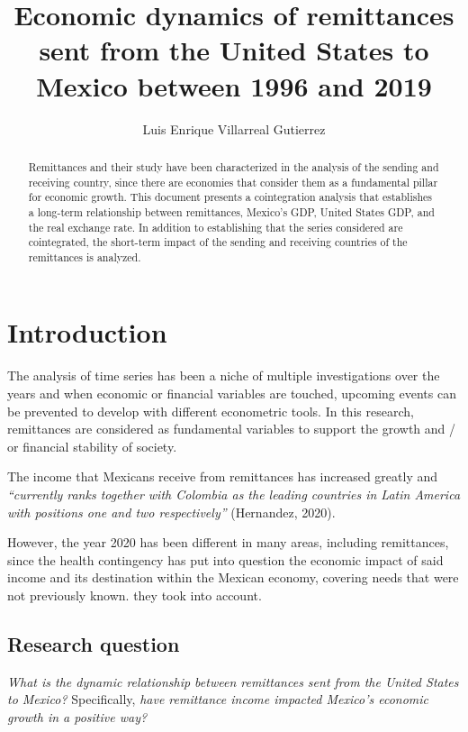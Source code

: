 \documentclass[12pt,english, spanish]{smfart}
\title{Economic dynamics of remittances sent from the United States to Mexico between 1996 and 2019}
\author{Luis Enrique Villarreal Gutierrez}
\begin{document}
\def\smfbyname{}

\begin{abstract}
Remittances and their study have been characterized in the analysis of the sending and receiving country, since there are economies that consider them as a fundamental pillar for economic growth. This document presents a cointegration analysis that establishes a long-term relationship between remittances, Mexico's GDP, United States GDP, and the real exchange rate.
In addition to establishing that the series considered are cointegrated, the short-term impact of the sending and receiving countries of the remittances is analyzed.
\end{abstract}

\maketitle

\tableofcontents

\section{Introduction}
The analysis of time series has been a niche of multiple investigations over the years and when economic or financial variables are touched, upcoming events can be prevented to develop with different econometric tools. In this research, remittances are considered as fundamental variables to support the growth and / or financial stability of society.\par
The income that Mexicans receive from remittances has increased greatly and \textit{“currently ranks together with Colombia as the leading countries in Latin America with positions one and two respectively”} (Hernandez, 2020). \par
However, the year 2020 has been different in many areas, including remittances, since the health contingency has put into question the economic impact of said income and its destination within the Mexican economy, covering needs that were not previously known. they took into account.\par

\subsection{Research question}
\textit{What is the dynamic relationship between remittances sent from the United States to Mexico?} Specifically, \textit{have remittance income impacted Mexico's economic growth in a positive way?}
\end{document}
